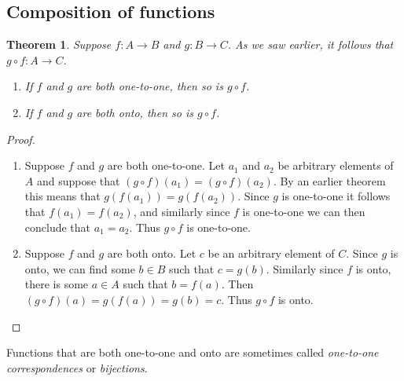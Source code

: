 \documentclass{report}
\newtheorem*{theorem}{Theorem}
\theoremstyle{definition}
\begin{document}
\subsection{Composition of functions}
\begin{theorem}
Suppose $f:A\to B$ and $g:B\to C$. As we saw earlier, it follows that $g\circ f:A\to C$. 
\begin{enumerate}
\item If $f$ and $g$ are both one-to-one, then so is $g\circ f$.
\item If $f$ and $g$ are both onto, then so is $g\circ f$.
\end{enumerate}
\end{theorem}
\begin{proof}\hspace{1mm}
\begin{enumerate}
\item Suppose $f$ and $g$ are both one-to-one. Let $a_1$ and $a_2$ be arbitrary elements of $A$ and suppose that $(g\circ f)(a_1)=(g\circ f)(a_2)$. By an earlier theorem this means that 
$g(f(a_1))=g(f(a_2))$. Since $g$ is one-to-one it follows that $f(a_1)=f(a_2)$, and similarly since $f$ is one-to-one we can then conclude that $a_1=a_2$. Thus $g\circ f$ is one-to-one.
\item Suppose $f$ and $g$ are both onto. Let $c$ be an arbitrary element of $C$. Since $g$ is onto, we can find some $b\in B$ such that $c=g(b)$. Similarly since $f$ is onto, there is some $a\in A$
such that $b=f(a)$.
Then $(g\circ f)(a)=g(f(a))=g(b)=c$. Thus $g\circ f$ is onto.\qedhere
\end{enumerate}
\end{proof}
\noindent Functions that are both one-to-one and onto are sometimes called \textit{one-to-one correspondences} or \textit{bijections}. 
\newpage
\end{document}
